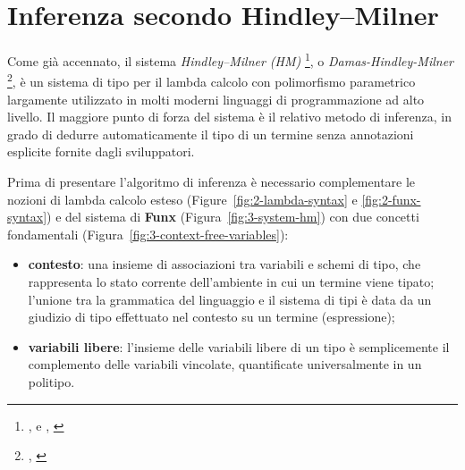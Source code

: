 \section{Inferenza secondo Hindley–Milner}
\label{sec:3-4-hm-type-inference}

Come già accennato, il sistema \textit{Hindley–Milner (HM)}%
\footnote{, \cite{Hindley-1969-SchemeObject}
    e , \cite{Milner-1978-TheoryPolymorphism}},
o \textit{Damas-Hindley-Milner}%
\footnote{, \cite{Damas-1982-PrincipalSchemes}},
è un sistema di tipo per il lambda calcolo con polimorfismo parametrico largamente utilizzato
in molti moderni linguaggi di programmazione ad alto livello. Il maggiore punto di forza del sistema
è il relativo metodo di inferenza, in grado di dedurre automaticamente il tipo di un termine
senza annotazioni esplicite fornite dagli sviluppatori.


Prima di presentare l'algoritmo di inferenza è necessario complementare le nozioni di lambda calcolo esteso
(Figure~\ref{fig:2-lambda-syntax} e \ref{fig:2-funx-syntax}) e del sistema di \textbf{Funx} (Figura~\ref{fig:3-system-hm})
con due concetti fondamentali (Figura~\ref{fig:3-context-free-variables}):
\begin{itemize}
    \item \textbf{contesto}: una insieme di associazioni tra variabili e schemi di tipo,
          che rappresenta lo stato corrente dell'ambiente in cui un termine viene tipato; l'unione tra la grammatica
          del linguaggio e il sistema di tipi è data da un giudizio di tipo effettuato nel contesto su un termine (espressione);
    \item \textbf{variabili libere}: l'insieme delle variabili libere di un tipo è semplicemente il complemento
          delle variabili vincolate, quantificate universalmente in un politipo.
\end{itemize}

